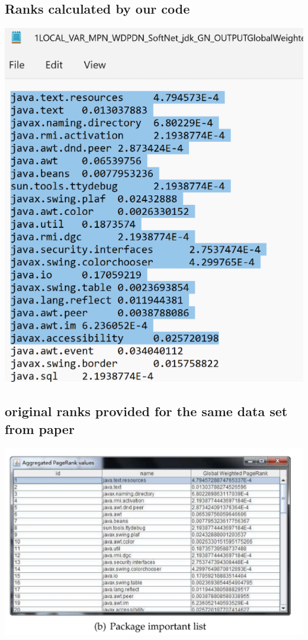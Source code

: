\documentclass{article}
\begin{document}
\subsection{Ranks calculated by our code}
\includegraphics[scale=0.7]{image1.png}

\subsection{original ranks provided for the same data set from paper}
\includegraphics[scale=0.7]{image2.png}
\end{document}
